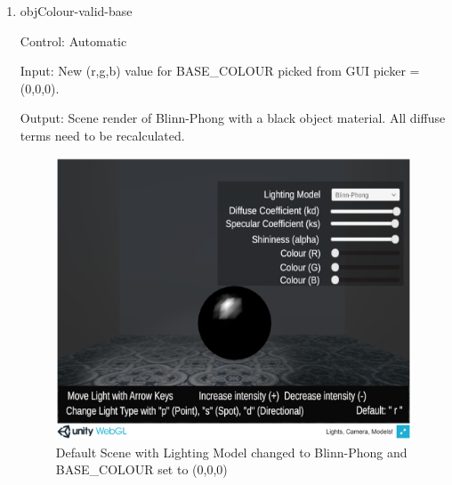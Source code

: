 \documentclass[12pt, titlepage]{article}
\begin{document}
\begin{enumerate}
%	
%	
%	
%	
%	
%	
%	

	\item{objColour-valid-base\\}
	
	Control: Automatic
	
	Input: New (r,g,b) value for BASE\_COLOUR picked from GUI picker = 
	(0,0,0).
	
	Output: Scene render of Blinn-Phong with a black object material. All 
	diffuse terms need to be recalculated.
	
	\begin{figure}[h]
		\centering
		\includegraphics[scale=0.25]{./images/sphere-lit-blinnphong-colour}
		\caption{Default Scene with Lighting Model changed to Blinn-Phong and 
			BASE\_COLOUR set to (0,0,0)}
		\label{fig:blinnPhong-black}
	\end{figure}	
	

\end{enumerate}
\end{document}
